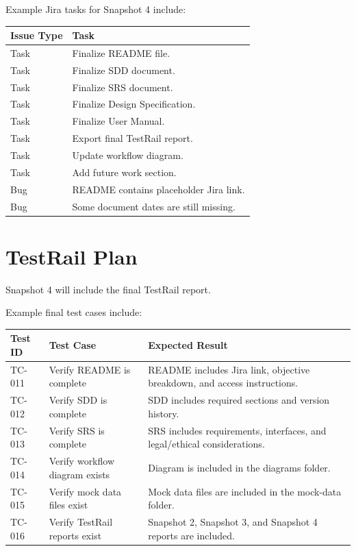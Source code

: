 \documentclass[12pt]{article}
\begin{document}
Example Jira tasks for Snapshot 4 include:

\begin{longtable}{|p{1.5in}|p{4.5in}|}
\hline
\textbf{Issue Type} & \textbf{Task} \\
\hline
Task & Finalize README file. \\
\hline
Task & Finalize SDD document. \\
\hline
Task & Finalize SRS document. \\
\hline
Task & Finalize Design Specification. \\
\hline
Task & Finalize User Manual. \\
\hline
Task & Export final TestRail report. \\
\hline
Task & Update workflow diagram. \\
\hline
Task & Add future work section. \\
\hline
Bug & README contains placeholder Jira link. \\
\hline
Bug & Some document dates are still missing. \\
\hline
\end{longtable}

\section{TestRail Plan}

Snapshot 4 will include the final TestRail report.

Example final test cases include:

\begin{longtable}{|p{1.2in}|p{2.4in}|p{2.4in}|}
\hline
\textbf{Test ID} & \textbf{Test Case} & \textbf{Expected Result} \\
\hline
TC-011 & Verify README is complete & README includes Jira link, objective breakdown, and access instructions. \\
\hline
TC-012 & Verify SDD is complete & SDD includes required sections and version history. \\
\hline
TC-013 & Verify SRS is complete & SRS includes requirements, interfaces, and legal/ethical considerations. \\
\hline
TC-014 & Verify workflow diagram exists & Diagram is included in the diagrams folder. \\
\hline
TC-015 & Verify mock data files exist & Mock data files are included in the mock-data folder. \\
\hline
TC-016 & Verify TestRail reports exist & Snapshot 2, Snapshot 3, and Snapshot 4 reports are included. \\
\hline
\end{longtable}
\end{document}
